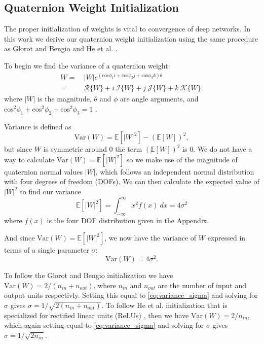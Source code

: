 \documentclass[conference]{IEEEtran}
\begin{document}
\subsection{Quaternion Weight Initialization}
The proper initialization of weights is vital to convergence of deep networks. 
In this work we derive our quaternion weight initialization using the same procedure as Glorot and Bengio \cite{glorot2010understanding} and He et al. \cite{he2015delving}.

To begin we find the variance of a quaternion weight:
\begin{align}
W = &~|W|e^{(\mbox{cos}\phi_1 \textit{i} + \mbox{cos}\phi_2 \textit{j} + \mbox{cos}\phi_3 \textit{k})\theta} \nonumber \\
= &~\mathscr{R}\{W\} + i~\mathscr{I}\{W\} + j~\mathscr{J}\{W\} + k~\mathscr{K}\{W\}.
\label{eq:quaternion_weight}
\end{align}
where $|W|$ is the magnitude, $\theta$ and $\phi$ are angle arguments, and $\mbox{cos}^2\phi_1 + \mbox{cos}^2\phi_2 + \mbox{cos}^2\phi_3 = 1$ \cite{turner2002}.

Variance is defined as
\begin{equation}
\mbox{Var}(W) = \mathbb{E}[|W|^2] - (\mathbb{E}[W])^2,
\label{eq:variance}
\end{equation}
but since $W$ is symmetric around 0 the term $(\mathbb{E}[W])^2$ is 0. 
We do not have a way to calculate $\mbox{Var}(W) = \mathbb{E}[|W|^2]$ so we make use of the magnitude of quaternion normal values $|W|$, which follows an independent normal distribution with four degrees of freedom (DOFs).
We can then calculate the expected value of $|W|^2$ to find our variance
\begin{equation}
\mathbb{E}[|W|^2] = \int_{-\infty}^\infty x^2 f(x) ~dx = 4\sigma^2
\label{eq:expected}
\end{equation}
where $f(x)$ is the four DOF distribution given in the Appendix.

And since $\mbox{Var}(W) = \mathbb{E}[|W|^2]$, we now have the variance of $W$ expressed in terms of a single parameter $\sigma$:
\begin{equation}
\mbox{Var}(W) = 4\sigma^2.
\label{eq:variance_sigma}
\end{equation}

To follow the Glorot and Bengio \cite{glorot2010understanding} initialization we have $\mbox{Var}(W) = 2/(n_{in}+n_{out})$, where $n_{in}$ and $n_{out}$ are the number of input and output units respectivly. 
Setting this equal to \eqref{eq:variance_sigma} and solving for $\sigma$ gives $\sigma = 1/\sqrt{2(n_{in}+n_{out})}$.
To follow He et al. \cite{he2015delving} initialization that is specialized for rectified linear units (ReLUs) \cite{nair2010rectified}, then we have $\mbox{Var}(W) = 2/n_{in}$, which again setting equal to \eqref{eq:variance_sigma} and solving for $\sigma$ gives $\sigma = 1/\sqrt{2n_{in}}$.
\end{document}
